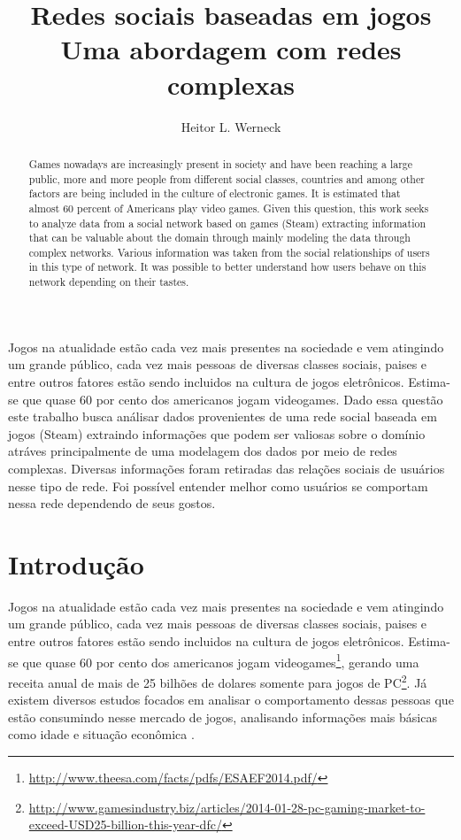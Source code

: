 \documentclass[12pt]{article}
\title{Redes sociais baseadas em jogos\\ Uma abordagem com redes complexas}
\author{Heitor L. Werneck\inst{1}}
\begin{document}
 

\maketitle

\begin{abstract}
				Games nowadays are increasingly present in society and have been reaching a large public, more and more people from different social classes, countries and among other factors are being included in the culture of electronic games. It is estimated that almost 60 percent of Americans play video games. Given this question, this work seeks to analyze data from a social network based on games (Steam) extracting information that can be valuable about the domain through mainly modeling the data through complex networks. Various information was taken from the social relationships of users in this type of network. It was possible to better understand how users behave on this network depending on their tastes.
\end{abstract}
     
\begin{resumo} 
				Jogos na atualidade estão cada vez mais presentes na sociedade e vem atingindo um grande público, cada vez mais pessoas de diversas classes sociais, paises e entre outros fatores estão sendo incluidos na cultura de jogos eletrônicos. Estima-se que quase 60 por cento dos americanos jogam videogames. Dado essa questão este trabalho busca análisar dados provenientes de uma rede social baseada em jogos (Steam) extraindo informações que podem ser valiosas sobre o domínio atráves principalmente de uma modelagem dos dados por meio de redes complexas. Diversas informações foram retiradas das relações sociais de usuários nesse tipo de rede. Foi possível entender melhor como usuários se comportam nessa rede dependendo de seus gostos.
\end{resumo}


\section{Introdução}

Jogos na atualidade estão cada vez mais presentes na sociedade e vem atingindo um grande público, cada vez mais pessoas de diversas classes sociais, paises e entre outros fatores estão sendo incluidos na cultura de jogos eletrônicos. Estima-se que quase 60 por cento dos americanos jogam videogames\footnote{\url{http://www.theesa.com/facts/pdfs/ESAEF2014.pdf/}}, gerando uma receita anual de mais de 25 bilhões de dolares somente para jogos de PC\footnote{\url{http://www.gamesindustry.biz/articles/2014-01-28-pc-gaming-market-to-exceed-USD25-billion-this-year-dfc/}}. Já existem diversos estudos focados em analisar o comportamento dessas pessoas que estão consumindo nesse mercado de jogos, analisando informações mais básicas como idade e situação econômica \cite{williams2008plays,griffiths2003breaking,kowert2014unpopular}.
\end{document}
